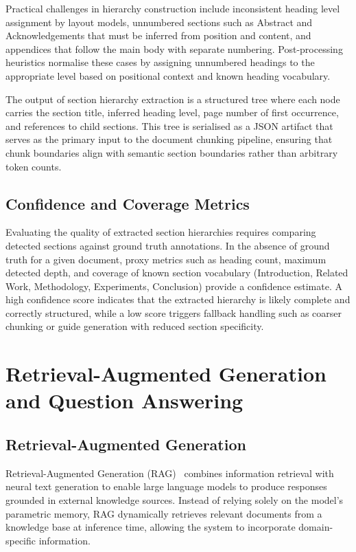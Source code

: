 \documentclass[12pt,a4paper]{report}
\begin{document}
Practical challenges in hierarchy construction include 
inconsistent heading level assignment by layout models, 
unnumbered sections such as Abstract and Acknowledgements 
that must be inferred from position and content, and 
appendices that follow the main body with separate numbering. 
Post-processing heuristics normalise these cases by 
assigning unnumbered headings to the appropriate level based 
on positional context and known heading vocabulary.

The output of section hierarchy extraction is a structured 
tree where each node carries the section title, inferred 
heading level, page number of first occurrence, and 
references to child sections. This tree is serialised as a 
JSON artifact that serves as the primary input to the 
document chunking pipeline, ensuring that chunk boundaries 
align with semantic section boundaries rather than arbitrary 
token counts.

\subsection{Confidence and Coverage Metrics}

Evaluating the quality of extracted section hierarchies 
requires comparing detected sections against ground truth 
annotations. In the absence of ground truth for a given 
document, proxy metrics such as heading count, maximum 
detected depth, and coverage of known section vocabulary 
(Introduction, Related Work, Methodology, Experiments, 
Conclusion) provide a confidence estimate. A high confidence 
score indicates that the extracted hierarchy is likely 
complete and correctly structured, while a low score 
triggers fallback handling such as coarser chunking or 
guide generation with reduced section specificity.
\section{Retrieval-Augmented Generation and Question Answering}

\subsection{Retrieval-Augmented Generation}

Retrieval-Augmented Generation (RAG)~\cite{lewis2020} combines information
retrieval with neural text generation to enable large language models to produce
responses grounded in external knowledge sources. Instead of relying solely on
the model's parametric memory, RAG dynamically retrieves relevant documents from
a knowledge base at inference time, allowing the system to incorporate
domain-specific information.
\end{document}
